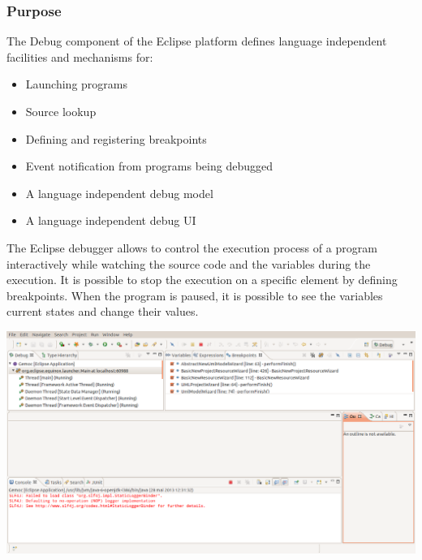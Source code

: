 \documentclass{gemoc} %
\begin{document}

\subsubsection{Purpose}
The Debug component of the Eclipse platform defines language independent facilities and mechanisms for:
\begin{itemize}
\item Launching programs
\item Source lookup
\item Defining and registering breakpoints
\item Event notification from programs being debugged
\item A language independent debug model
\item A language independent debug UI
\end{itemize}

The Eclipse debugger allows to control the execution process of a program interactively while watching the source code and the variables during the execution. It is possible to stop the execution on a specific element by defining breakpoints. When the program is paused, it is possible to see the variables current states and change their values.

\begin{center}
\includegraphics*[trim=0.0cm 0.0cm 0cm 0.0cm, clip=true, width=1.0\linewidth]{../images/EclipseDebugPerspective.png}
\end{center}
\end{document}
